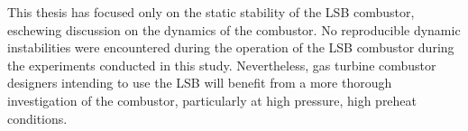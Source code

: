 This thesis has focused only on the static stability of the LSB combustor, eschewing discussion on the dynamics of the combustor.
No reproducible dynamic instabilities were encountered during the operation of the LSB combustor during the experiments conducted in this study.
Nevertheless, gas turbine combustor designers intending to use the LSB will benefit from a more thorough investigation of the combustor, particularly at high pressure, high preheat conditions.


